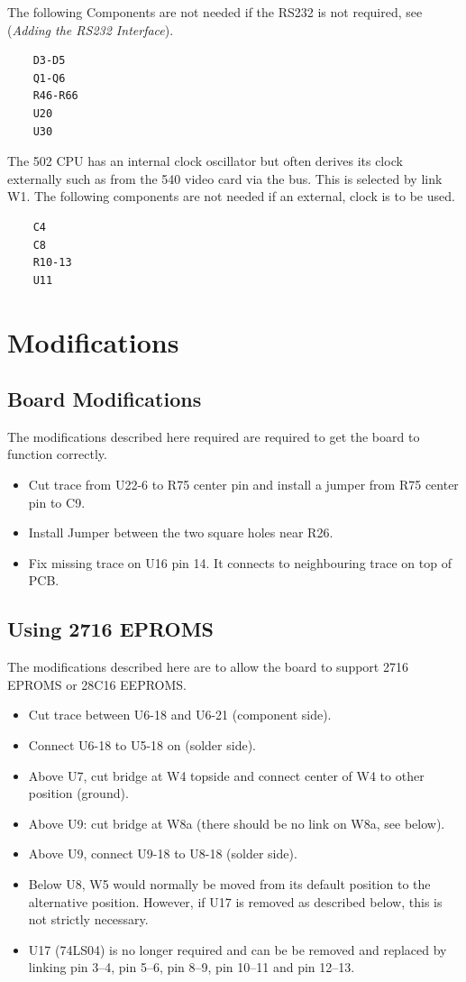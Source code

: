 The following Components are not needed if the RS232 is not required, see (\emph{Adding the RS232 Interface}).

\begin{verbatim}
    D3-D5
    Q1-Q6
    R46-R66
    U20
    U30
\end{verbatim}

The 502 CPU has an internal clock oscillator but often derives its clock externally such as from the 540 video card via the bus. This is selected by link W1. The following components are not needed if an external, clock is to be used.

\begin{verbatim}
    C4
    C8
    R10-13
    U11
\end{verbatim}    

\section{Modifications}

\subsection{Board Modifications}

The modifications described here required are required to get the board to function correctly.

\begin{itemize}
\item Cut trace from U22-6 to R75 center pin and install a jumper from R75 center pin to C9.
\item Install Jumper between the two square holes near R26.
\item Fix missing trace on U16 pin 14. It connects to neighbouring trace on top of PCB.
\end{itemize}

\subsection{Using 2716 EPROMS}

The modifications described here are to allow the board to support 2716 EPROMS or 28C16 EEPROMS.

\begin{itemize}
\item Cut trace between U6-18 and U6-21 (component side).
\item Connect U6-18 to U5-18 on (solder side).
\item Above U7, cut bridge at W4 topside and connect center of W4 to other position (ground).
\item Above U9: cut bridge at W8a (there should be no link on W8a, see below).
\item Above U9, connect U9-18 to U8-18 (solder side).
\item Below U8, W5 would normally be moved from its default position to the alternative position. However, if U17 is removed as described below, this is not strictly necessary.
\item U17 (74LS04) is no longer required and can be be removed and replaced by linking pin 3--4, pin 5--6, pin 8--9, pin 10--11 and pin 12--13.
\end{itemize}

